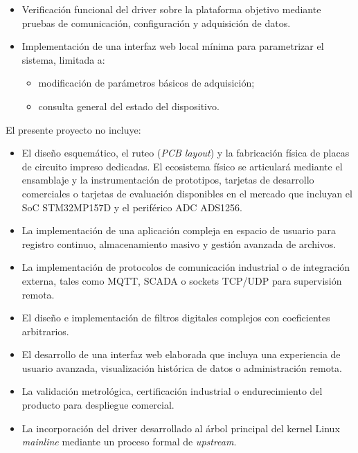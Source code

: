 \documentclass[
11pt, %
]{charter}
\begin{document}
\begin{itemize}
    \item Verificación funcional del driver sobre la plataforma objetivo mediante pruebas de comunicación, configuración y adquisición de datos.

    \item Implementación de una interfaz web local mínima para parametrizar el sistema, limitada a:
    \begin{itemize}
        \item modificación de parámetros básicos de adquisición;
        \item consulta general del estado del dispositivo.
    \end{itemize}
\end{itemize}

El presente proyecto no incluye:

\begin{itemize}
    \item El diseño esquemático, el ruteo (\textit{PCB layout}) y la fabricación física de placas de circuito impreso dedicadas. El ecosistema físico se articulará mediante el ensamblaje y la instrumentación de prototipos, tarjetas de desarrollo comerciales o tarjetas de evaluación disponibles en el mercado que incluyan el SoC STM32MP157D y el periférico ADC ADS1256.

    \item La implementación de una aplicación compleja en espacio de usuario para registro continuo, almacenamiento masivo y gestión avanzada de archivos.

    \item La implementación de protocolos de comunicación industrial o de integración externa, tales como MQTT, SCADA o sockets TCP/UDP para supervisión remota.

    \item El diseño e implementación de filtros digitales complejos con coeficientes arbitrarios.

    \item El desarrollo de una interfaz web elaborada que incluya una experiencia de usuario avanzada, visualización histórica de datos o administración remota.

    \item La validación metrológica, certificación industrial o endurecimiento del producto para despliegue comercial.

    \item La incorporación del driver desarrollado al árbol principal del kernel Linux \textit{mainline} mediante un proceso formal de \textit{upstream}.
\end{itemize}
\end{document}
